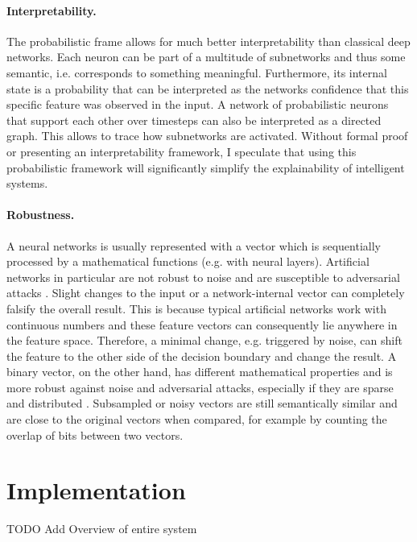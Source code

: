 \paragraph{Interpretability.} The probabilistic frame allows for much better interpretability than classical deep networks. Each neuron can be part of a multitude of subnetworks and thus some semantic, i.e. corresponds to something meaningful. Furthermore, its internal state is a probability that can be interpreted as the networks confidence that this specific feature was observed in the input. A network of probabilistic neurons that support each other over timesteps can also be interpreted as a directed graph. This allows to trace how subnetworks are activated. Without formal proof or presenting an interpretability framework, I speculate that using this probabilistic framework will significantly simplify the explainability of intelligent systems.

\paragraph{Robustness.} A neural networks is usually represented with a vector which is sequentially processed by a mathematical functions (e.g. with neural layers). Artificial networks in particular are not robust to noise and are susceptible to adversarial attacks . Slight changes to the input or a network-internal vector can completely falsify the overall result. This is because typical artificial networks work with continuous numbers and these feature vectors can consequently lie anywhere in the feature space. Therefore, a minimal change, e.g. triggered by noise, can shift the feature to the other side of the decision boundary and change the result. A binary vector, on the other hand, has different mathematical properties and is more robust against noise and adversarial attacks, especially if they are sparse and distributed .
Subsampled or noisy vectors are still semantically similar and are close to the original vectors when compared, for example by counting the overlap of bits between two vectors.

\section{Implementation}
TODO Add Overview of entire system


